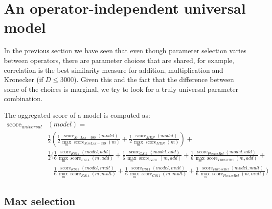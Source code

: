 \section{An operator-independent universal model}
\label{sec:single}

In the previous section we have seen that even though parameter selection varies between operators, there are parameter choices that are shared, for example, correlation is the best similarity measure for addition, multiplication and Kronecker (if $D \le 3000$). Given this and the fact that the difference between some of the choices is marginal, we try to look for a truly universal parameter combination.

The aggregated score of a model is computed as:
\scriptsize
\begin{align*}
\operatorname{score}_\mathit{universal}&(\mathit{model}) =\\%
& \frac{1}{2}\left(
\frac{1}{2}%
\frac{\operatorname{score}_\mathit{SimLex-999}(\mathit{model})}%
{\max_m\operatorname{score}_\mathit{SimLex-999}(m)}%
+%
\frac{1}{2}%
\frac{\operatorname{score}_\mathit{MEN}(\mathit{model})}%
{\max_m\operatorname{score}_\mathit{MEN}(m)}%
\right)+
\\
&\frac{1}{2}\Bigg(
\frac{1}{6}%
\frac{\operatorname{score}_\mathit{KS14}(\mathit{model}, \mathit{add})}%
{\max_m\operatorname{score}_\mathit{KS14}(m, \mathit{add})}%
+%
\frac{1}{6}%
\frac{\operatorname{score}_\mathit{GS11}(\mathit{model}, \mathit{add})}%
{\max_m\operatorname{score}_\mathit{GS11}(m, \mathit{add})}%
+%
\frac{1}{6}%
\frac{\operatorname{score}_\mathit{PhraseRel}(\mathit{model, \mathit{add}})}%
{\max_m\operatorname{score}_\mathit{PhraseRel}(m, \mathit{add})}
+
\\
&\phantom{\frac{1}{2}\Bigg(}
\frac{1}{6}%
\frac{\operatorname{score}_\mathit{KS14}(\mathit{model}, \mathit{mult})}%
{\max_m\operatorname{score}_\mathit{KS14}(m, \mathit{mult})}%
+%
\frac{1}{6}%
\frac{\operatorname{score}_\mathit{GS11}(\mathit{model}, \mathit{mult})}%
{\max_m\operatorname{score}_\mathit{GS11}(m, \mathit{mult})}%
+%
\frac{1}{6}%
\frac{\operatorname{score}_\mathit{PhraseRel}(\mathit{model, \mathit{mult}})}%
{\max_m\operatorname{score}_\mathit{PhraseRel}(m, \mathit{mult})}
\Bigg)
\end{align*}
\normalsize

\subsection{Max selection}
\label{sec:max-selection-single}

